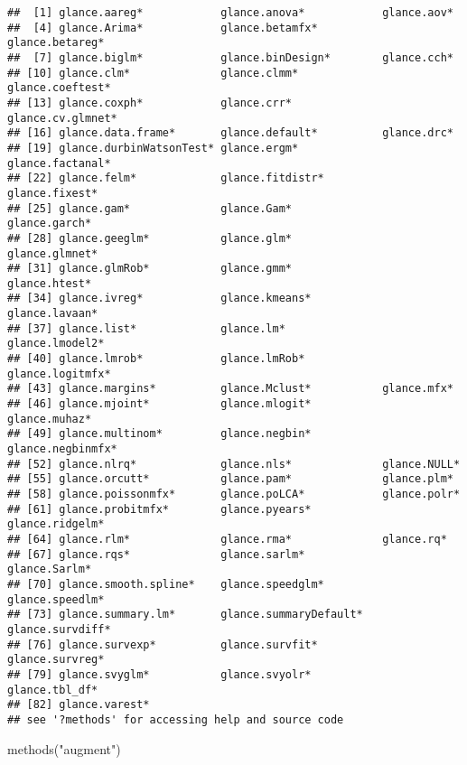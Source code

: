 \documentclass[
]{book}
\newenvironment{Shaded}{\begin{snugshade}}{\end{snugshade}}
\newcommand{\FunctionTok}[1]{\textcolor[rgb]{0.00,0.00,0.00}{#1}}
\newcommand{\NormalTok}[1]{#1}
\newcommand{\StringTok}[1]{\textcolor[rgb]{0.31,0.60,0.02}{#1}}
\begin{document}
\begin{verbatim}
##  [1] glance.aareg*            glance.anova*            glance.aov*             
##  [4] glance.Arima*            glance.betamfx*          glance.betareg*         
##  [7] glance.biglm*            glance.binDesign*        glance.cch*             
## [10] glance.clm*              glance.clmm*             glance.coeftest*        
## [13] glance.coxph*            glance.crr*              glance.cv.glmnet*       
## [16] glance.data.frame*       glance.default*          glance.drc*             
## [19] glance.durbinWatsonTest* glance.ergm*             glance.factanal*        
## [22] glance.felm*             glance.fitdistr*         glance.fixest*          
## [25] glance.gam*              glance.Gam*              glance.garch*           
## [28] glance.geeglm*           glance.glm*              glance.glmnet*          
## [31] glance.glmRob*           glance.gmm*              glance.htest*           
## [34] glance.ivreg*            glance.kmeans*           glance.lavaan*          
## [37] glance.list*             glance.lm*               glance.lmodel2*         
## [40] glance.lmrob*            glance.lmRob*            glance.logitmfx*        
## [43] glance.margins*          glance.Mclust*           glance.mfx*             
## [46] glance.mjoint*           glance.mlogit*           glance.muhaz*           
## [49] glance.multinom*         glance.negbin*           glance.negbinmfx*       
## [52] glance.nlrq*             glance.nls*              glance.NULL*            
## [55] glance.orcutt*           glance.pam*              glance.plm*             
## [58] glance.poissonmfx*       glance.poLCA*            glance.polr*            
## [61] glance.probitmfx*        glance.pyears*           glance.ridgelm*         
## [64] glance.rlm*              glance.rma*              glance.rq*              
## [67] glance.rqs*              glance.sarlm*            glance.Sarlm*           
## [70] glance.smooth.spline*    glance.speedglm*         glance.speedlm*         
## [73] glance.summary.lm*       glance.summaryDefault*   glance.survdiff*        
## [76] glance.survexp*          glance.survfit*          glance.survreg*         
## [79] glance.svyglm*           glance.svyolr*           glance.tbl_df*          
## [82] glance.varest*          
## see '?methods' for accessing help and source code
\end{verbatim}

\begin{Shaded}
\begin{Highlighting}[]
\FunctionTok{methods}\NormalTok{(}\StringTok{"augment"}\NormalTok{)}
\end{Highlighting}
\end{Shaded}
\end{document}
